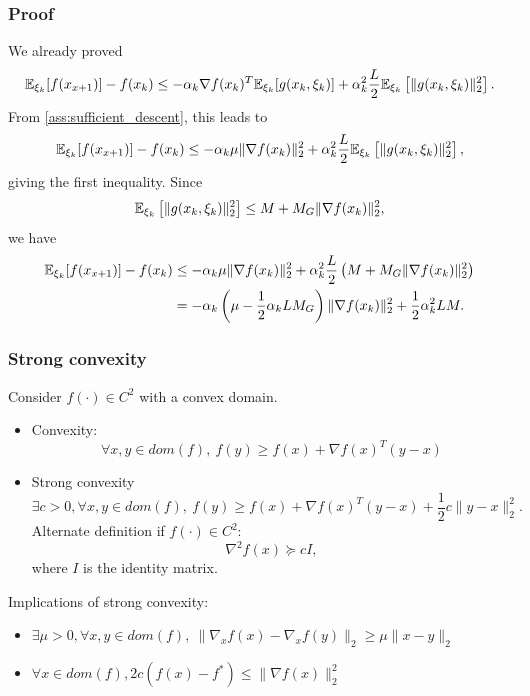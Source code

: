 \documentclass[usepdftitle=false, aspectratio=169]{beamer}
\begin{document}
\begin{frame}
\frametitle{Proof}

We already proved
$$
	{\mathbb{E}}_{\xi_k} [f(x_{x+1})] - f(x_k) \leq - \alpha_k \nabla f(x_k)^T {\mathbb{E}}_{\xi_k} [ g(x_k, \xi_k) ] + \alpha_k^2 \frac{L}{2} {\mathbb{E}}_{\xi_k} \left[ \| g(x_k, \xi_k) \|^2_2 \right].	
$$
From \ref{ass:sufficient_descent}, this leads to
$$
{\mathbb{E}}_{\xi_k} [f(x_{x+1})] - f(x_k) \leq - \alpha_k \mu \| \nabla f(x_k) \|_2^2 + \alpha_k^2 \frac{L}{2} {\mathbb{E}}_{\xi_k} \left[ \| g(x_k, \xi_k) \|^2_2 \right],
$$
giving the first inequality. Since
$$
{\mathbb{E}}_{\xi_k} \left[ \| g(x_k, \xi_k) \|^2_2 \right] \leq M + M_G \| \nabla f(x_k) \|_2^2,
$$
we have
\begin{align*}
{\mathbb{E}}_{\xi_k} [f(x_{x+1})] - f(x_k) & \leq - \alpha_k \mu \| \nabla f(x_k) \|_2^2 + \alpha_k^2 \frac{L}{2} \left( M + M_G \| \nabla f(x_k) \|_2^2 \right) \\
& =  - \alpha_k \left( \mu - \frac{1}{2} \alpha_k L M_G \right) \| \nabla f(x_k) \|_2^2 + \frac{1}{2} \alpha_k^2 LM.
\end{align*}

\end{frame}

\begin{frame}
\frametitle{Strong convexity}

Consider $f(\cdot) \in C^2$ with a convex domain.
\begin{itemize}
	\item Convexity:
	$$
	\forall x, y \in dom(f),\ f(y) \geq f(x) + \nabla f(x)^T(y-x)
	$$
	\item Strong convexity
	\begin{equation}
	\exists c > 0, \forall x, y \in dom(f),\ f(y) \geq f(x) + \nabla f(x)^T(y-x) + \frac{1}{2} c \| y - x \|^2_2.
	\tag{A.8}
	\label{ass:strong_convexity}
	\end{equation}
	Alternate definition if $f(\cdot) \in C^2$:
	$$
	\nabla^2 f(x) \succeq cI,
	$$
	where $I$ is the identity matrix.
\end{itemize}

Implications of strong convexity:
\begin{itemize}
	\item
	$\exists \mu > 0, \forall x, y \in dom(f),\ \| \nabla_x f(x) - \nabla_x f(y) \|_2 \geq \mu \| x - y \|_2$
	\item
	$\forall x \in dom(f), 2c (f(x) - f^*) \leq \| \nabla f(x) \|_2^2$
\end{itemize}

\end{frame}
\end{document}
